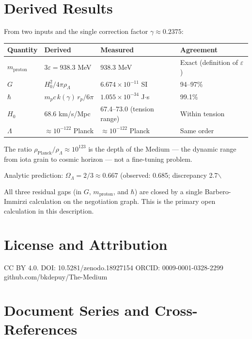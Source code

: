\documentclass[11pt,letterpaper]{article}
\begin{document}
\section{Derived Results}
\label{sec:orgbdcd00e}

From two inputs and the single correction factor \(\gamma \approx 0.2375\):

\begin{center}
\begin{tabular}{llll}
\toprule
\textbf{Quantity} & \textbf{Derived} & \textbf{Measured} & \textbf{Agreement}\\[0pt]
\midrule
\(m_\text{proton}\) & \(3\varepsilon = 938.3\) MeV & 938.3 MeV & Exact (definition of \(\varepsilon\))\\[0pt]
\(G\) & \(H_0^2 / 4\pi\rho_\Lambda\) & \(6.674\times10^{-11}\) SI & 94--97\%\\[0pt]
\(\hbar\) & \(m_p c\,k(\gamma)\,r_p / 6\pi\) & \(1.055\times10^{-34}\) J\(\cdot\)s & 99.1\%\\[0pt]
\(H_0\) & 68.6 km/s/Mpc & 67.4--73.0 (tension range) & Within tension\\[0pt]
\(\Lambda\) & \(\approx 10^{-122}\) Planck & \(\approx 10^{-122}\) Planck & Same order\\[0pt]
\bottomrule
\end{tabular}
\end{center}

The ratio \(\rho_\text{Planck}/\rho_\Lambda \approx 10^{123}\) is the depth of the Medium --- the dynamic range from iota grain to cosmic horizon --- not a fine-tuning problem.

Analytic prediction: \(\Omega_\Lambda = 2/3 \approx 0.667\) (observed: 0.685; discrepancy 2.7$\backslash$%

All three residual gaps (in \(G\), \(m_\text{proton}\), and \(\hbar\)) are closed by a single Barbero-Immirzi calculation on the negotiation graph. This is the primary open calculation in this description.

\section{License and Attribution}
\label{sec:orgc595172}

CC BY 4.0. DOI: 10.5281/zenodo.18927154 \quad ORCID: 0009-0001-0328-2299 \quad github.com/bkdepuy/The-Medium

\section{Document Series and Cross-References}
\label{sec:orgc1ec7f1}
\end{document}
